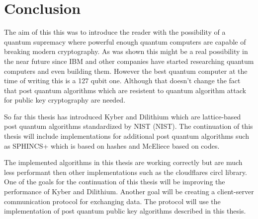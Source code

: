 \chapter*{Conclusion}
{}

The aim of this this was to introduce the reader with the possibility of a quantum supremacy where powerful enough quantum computers are capable of breaking modern cryptography. As was shown this might be a real possibility in the near future since IBM and other companies have started researching quantum computers and even building them. However the best quantum computer at the time of writing this is a 127 qubit one. Although that doesn't change the fact that post quantum algorithms which are resistent to quantum algorithm attack for public key cryptography are needed.

So far this thesis has introduced Kyber and Dilithium which are lattice-based post quantum algorithms standardized by NIST (\acl{NIST}). The continuation of this thesis will include implementations for additional post quantum algorithms such as SPHINCS+ which is based on hashes and McEliece based on codes.

The implemented algorithms in this thesis are working correctly but are much less performant then other implementations such as the cloudflares circl library. One of the goals for the continuation of this thesis will be improving the performance of Kyber and Dilithium. Another goal will be creating a client-server communication protocol for exchanging data. The protocol will use the implementation of post quantum public key algorithms described in this thesis.